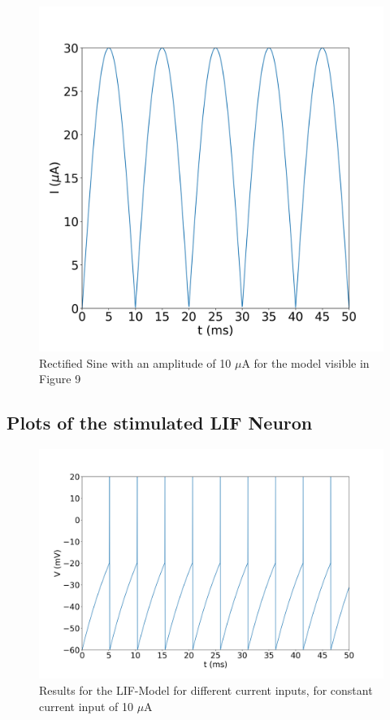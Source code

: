 \documentclass{scrartcl}			%
\begin{document}
\begin{figure}[hbpt!]					%
	\centering
	\includegraphics[scale=0.33]{2_1.png}
	\captionsetup{width=\linewidth}  %
	\caption{Rectified Sine with an amplitude of 10 $\mu$A for the model visible in Figure 9}
	\label{subsec_fig2_0} %
\end{figure}

\newpage
\subsection{Plots of the stimulated LIF Neuron}

\begin{figure}[hbpt!]					%
	\centering
	\includegraphics[scale=0.32]{3_1.png}
	\captionsetup{width=\linewidth}  %
	\caption{Results for the LIF-Model for different current inputs, for constant current input of 10 $\mu$A}
	\label{subsec_fig2_1} %
\end{figure}
\end{document}
